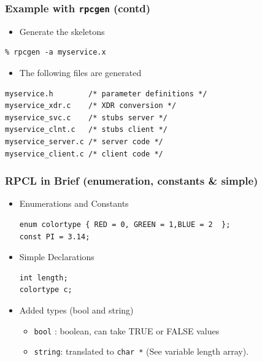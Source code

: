\documentclass[bigger,hyperref={colorlinks=true, urlcolor=red, plainpages=false, pdfpagelabels, bookmarksnumbered}]{beamer}
\begin{document}
\begin{frame}[fragile]
\frametitle{Example with \texttt{rpcgen} (contd)}
\label{sec-2-15}

\begin{itemize}
\item Generate the skeletons
\end{itemize}

\lstset{language=C}
\begin{lstlisting}
% rpcgen -a myservice.x
\end{lstlisting}
\begin{itemize}
\item The following files are generated
\end{itemize}

\lstset{language=C}
\begin{lstlisting}
myservice.h        /* parameter definitions */
myservice_xdr.c    /* XDR conversion */
myservice_svc.c    /* stubs server */   
myservice_clnt.c   /* stubs client */
myservice_server.c /* server code */
myservice_client.c /* client code */
\end{lstlisting}
\end{frame}
\begin{frame}[fragile]
\frametitle{RPCL in Brief (enumeration, constants \& simple)}
\label{sec-2-16}
\begin{itemize}

\item Enumerations and Constants\\
\label{sec-2-16-1}%
\lstset{language=C}
\begin{lstlisting}
enum colortype { RED = 0, GREEN = 1,BLUE = 2  };
const PI = 3.14;
\end{lstlisting}

\item Simple Declarations\\
\label{sec-2-16-2}%
\lstset{language=C}
\begin{lstlisting}
int length;
colortype c;
\end{lstlisting}

\item Added types (bool and string)
\label{sec-2-16-3}%
\begin{itemize}
\item \texttt{bool} : boolean, can take TRUE or FALSE values
\item \texttt{string}: translated to \texttt{char *} (See variable length array).
\end{itemize}
\end{itemize} %
\end{frame}
\end{document}
